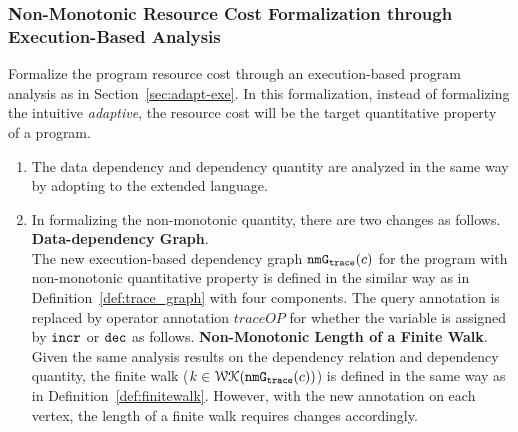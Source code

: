 \subsubsection{Non-Monotonic Resource Cost Formalization through Execution-Based Analysis} 
Formalize the program resource cost through an execution-based program analysis as in Section~\ref{sec:adapt-exe}.
In this formalization, instead of formalizing the intuitive \emph{adaptive}, the resource cost will be the
target quantitative property of a program.
\begin{enumerate}
    \item The data dependency and dependency quantity are analyzed in the same way by adopting to the extended language.
    \item In formalizing the non-monotonic quantity, there are two changes as follows.
    \\
    \textbf{Data-dependency Graph}.
    \\
    The new execution-based dependency graph $\mathtt{nmG_{trace}}(c)$ for the program with non-monotonic quantitative property is defined in the
    similar way as in Definition~\ref{def:trace_graph} with four components.
    The query annotation is replaced by operator annotation $traceOP$ for whether the variable is assigned by $\mathtt{incr}$ or $\mathtt{dec}$ as follows.
    \textbf{Non-Monotonic Length of a Finite Walk}.
    \\
    Given the same analysis results on the dependency relation and dependency quantity, 
    the finite walk ($k \in \mathcal{WK}(\mathtt{nmG_{trace}}(c))$) is defined in the same way as in Definition~\ref{def:finitewalk}. However, with the new annotation on each vertex, the length of a finite walk requires changes accordingly.

\end{enumerate}
